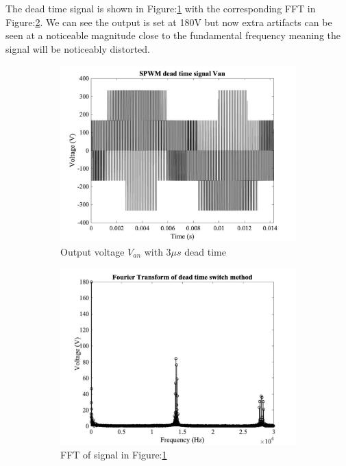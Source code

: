 \documentclass{article}
\begin{document}
The dead time signal is shown in Figure:\ref{fig:2ca} with the corresponding FFT in Figure:\ref{fig:2cb}. We can see the output is set at 180V but now extra artifacts can be seen at a noticeable magnitude close to the fundamental frequency meaning the signal will be noticeably distorted.

\begin{figure}[H]
\begin{subfigure}{.5\textwidth}
  \centering
\includegraphics[scale=0.15]{2c1.jpg}
\caption{Output voltage $V_{an}$ with $3\mu s$ dead time}
\label{fig:2ca}
\end{subfigure}%
\begin{subfigure}{.5\textwidth}
  \centering
\includegraphics[scale=0.15]{2c2.jpg}
\caption{FFT of signal in Figure:\ref{fig:2ca}}
\label{fig:2cb}
\end{subfigure}
\caption{}
\label{fig:fig6}
\end{figure}
\end{document}
